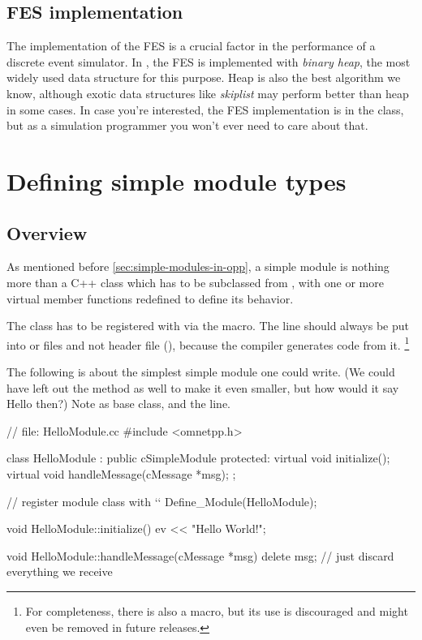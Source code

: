 \subsection{FES implementation}
\label{sec:simple-modules:fes-implementation}

The implementation of the FES is a crucial factor in the
performance of a discrete event simulator. In {\opp}, the FES is
implemented with \textit{binary heap}, the most
widely used data structure for this purpose. Heap is also the best
algorithm we know, although exotic data structures like
\textit{skiplist} may perform better than heap in some
cases. In case you're interested, the FES implementation is in the
 class, but as a simulation programmer you won't
ever need to care about that.





\section{Defining simple module types}
\label{sec:simple-modules:defining-simple-modules}

\subsection{Overview}

As mentioned before \ref{sec:simple-modules-in-opp}, a simple module
is nothing more than a C++ class which has to be subclassed from
, with one or more virtual member functions redefined
to define its behavior.

The class has to be registered with {\opp} via the  macro.
The  line should always be put into  or 
files and not header file (), because the compiler generates code from it.
      \footnote{For completeness, there is also a 
                macro, but its use is discouraged and might even be removed in
                future {\opp} releases.}

The following  is about the simplest simple module one could write.
(We could have left out the  method as well to make it even smaller,
but how would it say Hello then?) Note  as base class,
and the  line.

\begin{cpp}
// file: HelloModule.cc
#include <omnetpp.h>

class HelloModule : public cSimpleModule
{
  protected:
    virtual void initialize();
    virtual void handleMessage(cMessage *msg);
};

// register module class with `\opp`
Define_Module(HelloModule);

void HelloModule::initialize()
{
    ev << "Hello World!\n";
}

void HelloModule::handleMessage(cMessage *msg)
{
    delete msg; // just discard everything we receive
}
\end{cpp}


